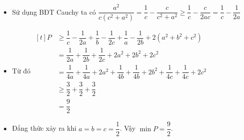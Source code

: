 \lgi 
\begin{itemize}[label=,leftmargin=*]
\item Sử dụng BĐT Cauchy ta có $\dfrac{a^2}{c(c^2+a^2)}=\dfrac{1}{c}-\dfrac{c}{c^2+a^2}\ge \dfrac{1}{c}-\dfrac{c}{2ac}=\dfrac{1}{c}-\dfrac{1}{2a}$
\item Từ đó $\begin{aligned}[t]P&\ge \dfrac{1}{c}-\dfrac{1}{2a}+\dfrac{1}{b}-\dfrac{1}{2c}+\dfrac{1}{a}-\dfrac{1}{2b}+2(a^2+b^2+c^2) \\
&=\dfrac{1}{2a}+\dfrac{1}{2b}+\dfrac{1}{2c}+2a^2+2b^2+2c^2 \\
&=\dfrac{1}{4a}+\dfrac{1}{4a}+2a^2+\dfrac{1}{4b}+\dfrac{1}{4b}+2b^2+\dfrac{1}{4c}+\dfrac{1}{4c}+2c^2 \\
&\ge \dfrac{3}{2}+\dfrac{3}{2}+\dfrac{3}{2}\\
&=\dfrac{9}{2}\end{aligned}$
\item Đẳng thức xảy ra khi $a=b=c=\dfrac{1}{2}$. Vậy $\min P=\dfrac{9}{2}$.
\end{itemize}

